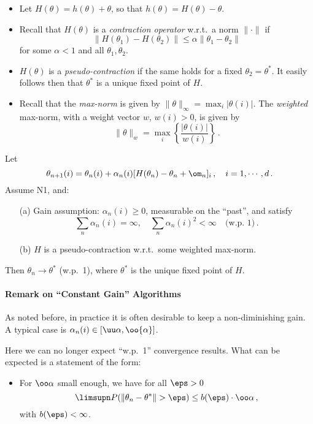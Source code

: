 \begin{itemize}
\item
Let $H(\theta) = h(\theta) + \theta$, so that $h(\theta) = H(\theta) - \theta$.
\item
Recall that $H(\theta)$ is a {\em contraction operator} w.r.t.\ a norm
$\|\cdot\|$ if
$$
\| H(\theta_1) - H(\theta_2)\| \le \alpha \| \theta_1 - \theta_2\|
$$
for some $\alpha < 1$ and all $\theta_1, \theta_2$.
\item
$H(\theta)$ is a {\em pseudo-contraction} if the same holds for a
fixed $\theta_2=\theta^*$.
It easily follows then that $\theta^*$ is a unique fixed point of $H$.
\item
Recall that the {\em max-norm} is given by
$\|\theta\|_\infty = \max_i |\theta(i)|$.
The {\em weighted} max-norm, with a weight vector $w$, $w(i) > 0$, is given by
$$
\|\theta\|_w = \max_i \left\{ \frac{|\theta(i)|}{w(i)}\right\} 
\,.
$$
\end{itemize}

\begin{theorem}[Prop. 4.4. in B.\&T.]\label{thm:SA_2}
Let
$$
\theta_{n+1}(i) = \theta_n(i) + \alpha_n (i)  [H(\theta_n) - \theta_n +
\om_n]_i\,, \quad i=1, \cdots, d\,.
$$
Assume N1, and:
\begin{itemize}
\item[(a)]
Gain assumption: $\alpha_n(i) \ge 0$, measurable on the ``past'', and satisfy
$$
\sum_n \alpha_n(i) = \infty, \quad \sum_n \alpha_n(i)^2 < \infty \quad
\text{(w.p. 1)}\,.
$$
\item[(b)]
$H$ is a pseudo-contraction w.r.t.\ some weighted max-norm.
\end{itemize}
Then $\theta_n \to \theta^*$ (w.p.\  1), where $\theta^*$ is the unique fixed point
of $H$.
\end{theorem}



\paragraph{Remark on ``Constant Gain'' Algorithms}

As noted before, in practice it is often desirable to keep a non-diminishing
gain.
A typical case is $ \alpha_n(i)\in [\uu\alpha, \oo{\alpha}]$.

Here we can no longer expect ``w.p.\   1'' convergence results.  What can be
expected is a statement of the form:
\begin{itemize}
\item
For $\oo\alpha$ small enough, we have for all $\eps > 0$
$$
\limsupn P (\|\theta_n - \theta^* \| > \eps) \le b(\eps) \cdot
\oo\alpha\,,
$$
with $b(\eps) < \infty$.
\end{itemize}

